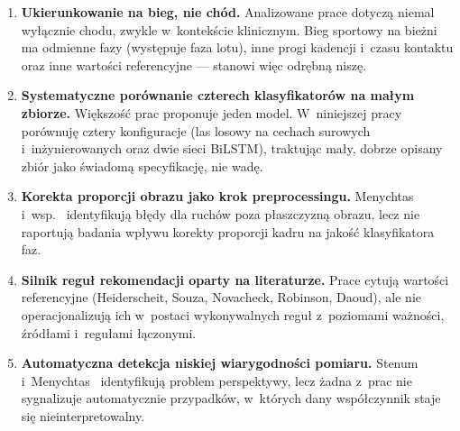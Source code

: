 \begin{enumerate}
    \item \textbf{Ukierunkowanie na bieg, nie chód.} Analizowane prace dotyczą niemal wyłącznie chodu, zwykle w~kontekście klinicznym. Bieg sportowy na bieżni ma odmienne fazy (występuje faza lotu), inne progi kadencji i~czasu kontaktu oraz inne wartości referencyjne --- stanowi więc odrębną niszę.
    \item \textbf{Systematyczne porównanie czterech klasyfikatorów na małym zbiorze.} Większość prac proponuje jeden model. W~niniejszej pracy porównuję cztery konfiguracje (las losowy na cechach surowych i~inżynierowanych oraz dwie sieci BiLSTM), traktując mały, dobrze opisany zbiór jako świadomą specyfikację, nie wadę.
    \item \textbf{Korekta proporcji obrazu jako krok preprocessingu.} Menychtas i~wsp.~\cite{menychtas2023} identyfikują błędy dla ruchów poza płaszczyzną obrazu, lecz nie raportują badania wpływu korekty proporcji kadru na jakość klasyfikatora faz.
    \item \textbf{Silnik reguł rekomendacji oparty na literaturze.} Prace cytują wartości referencyjne (Heiderscheit, Souza, Novacheck, Robinson, Daoud), ale nie operacjonalizują ich w~postaci wykonywalnych reguł z~poziomami ważności, źródłami i~regułami łączonymi.
    \item \textbf{Automatyczna detekcja niskiej wiarygodności pomiaru.} Stenum~\cite{stenum2021} i~Menychtas~\cite{menychtas2023} identyfikują problem perspektywy, lecz żadna z~prac nie sygnalizuje automatycznie przypadków, w~których dany współczynnik staje się nieinterpretowalny.
\end{enumerate}
